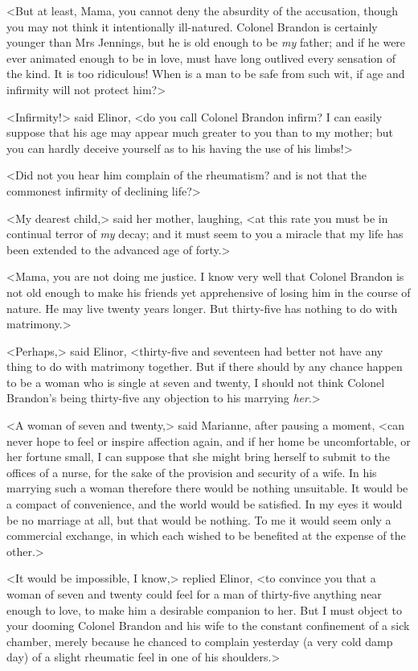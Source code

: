 <But at least, Mama, you cannot deny the absurdity of the accusation, though you may not think it intentionally ill-natured. Colonel Brandon is certainly younger than Mrs Jennings, but he is old enough to be \textit{my} father; and if he were ever animated enough to be in love, must have long outlived every sensation of the kind. It is too ridiculous! When is a man to be safe from such wit, if age and infirmity will not protect him?>

<Infirmity!> said Elinor, <do you call Colonel Brandon infirm? I can easily suppose that his age may appear much greater to you than to my mother; but you can hardly deceive yourself as to his having the use of his limbs!>

<Did not you hear him complain of the rheumatism? and is not that the commonest infirmity of declining life?>

<My dearest child,> said her mother, laughing, <at this rate you must be in continual terror of \textit{my} decay; and it must seem to you a miracle that my life has been extended to the advanced age of forty.>

<Mama, you are not doing me justice. I know very well that Colonel Brandon is not old enough to make his friends yet apprehensive of losing him in the course of nature. He may live twenty years longer. But thirty-five has nothing to do with matrimony.>

<Perhaps,> said Elinor, <thirty-five and seventeen had better not have any thing to do with matrimony together. But if there should by any chance happen to be a woman who is single at seven and twenty, I should not think Colonel Brandon's being thirty-five any objection to his marrying \textit{her}.>

<A woman of seven and twenty,> said Marianne, after pausing a moment, <can never hope to feel or inspire affection again, and if her home be uncomfortable, or her fortune small, I can suppose that she might bring herself to submit to the offices of a nurse, for the sake of the provision and security of a wife. In his marrying such a woman therefore there would be nothing unsuitable. It would be a compact of convenience, and the world would be satisfied. In my eyes it would be no marriage at all, but that would be nothing. To me it would seem only a commercial exchange, in which each wished to be benefited at the expense of the other.>

<It would be impossible, I know,> replied Elinor, <to convince you that a woman of seven and twenty could feel for a man of thirty-five anything near enough to love, to make him a desirable companion to her. But I must object to your dooming Colonel Brandon and his wife to the constant confinement of a sick chamber, merely because he chanced to complain yesterday (a very cold damp day) of a slight rheumatic feel in one of his shoulders.>

